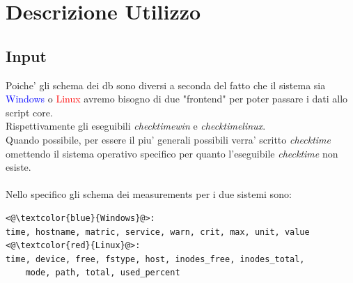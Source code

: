 \documentclass{article}
\begin{document}
\clearpage

\section*{Descrizione Utilizzo}

\subsection*{Input}
Poiche' gli schema dei db sono diversi a seconda del fatto che il sistema sia \textcolor{blue}{Windows} o \textcolor{red}{Linux} avremo bisogno di due "frontend" per poter passare i dati allo script core.\\
Rispettivamente gli eseguibili \textit{checktimewin} e \textit{checktimelinux}.\\
Quando possibile, per essere il piu' generali possibili verra' scritto \textit{checktime} omettendo il sistema operativo specifico per quanto l'eseguibile \textit{checktime} non esiste.
\\
\\
Nello specifico gli schema dei measurements per i due sistemi sono:

\begin{lstlisting}[]
<@\textcolor{blue}{Windows}@>:
time, hostname, matric, service, warn, crit, max, unit, value
<@\textcolor{red}{Linux}@>:
time, device, free, fstype, host, inodes_free, inodes_total, 
    mode, path, total, used_percent
\end{lstlisting}
\end{document}
